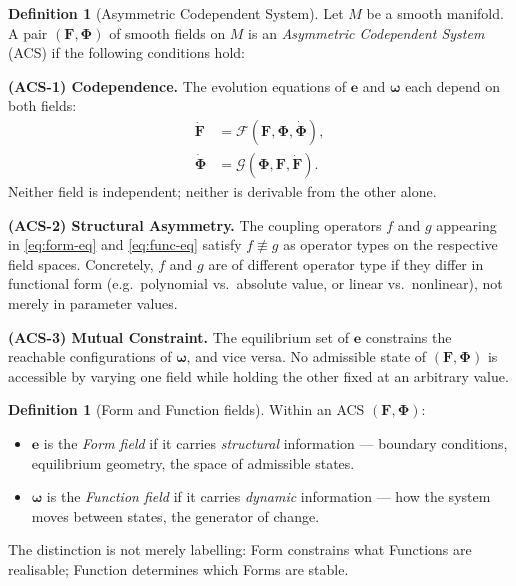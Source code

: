 \documentclass[12pt,a4paper]{article}
\theoremstyle{plain}
\theoremstyle{definition}
\newtheorem{definition}[theorem]{Definition}
\theoremstyle{remark}
\newcommand{\FormF}{\mathbf{F}}
\newcommand{\FuncF}{\boldsymbol{\Phi}}
\providecommand{\Form}{\mathbf{e}}
\providecommand{\Func}{\boldsymbol{\omega}}
\begin{document}
\begin{definition}[Asymmetric Codependent System]\label{def:acs}
Let $M$ be a smooth manifold.  A pair $(\FormF, \FuncF)$ of smooth fields on 
$M$ is an \emph{Asymmetric Codependent System} (ACS) if the following 
conditions hold:

\medskip
\noindent\textbf{(ACS-1) Codependence.}
The evolution equations of $\Form$ and $\Func$ each depend on both fields:
\begin{align}
\dot{\FormF} &= \mathcal{F}(\FormF, \FuncF, \dot{\FuncF}), \label{eq:form-eq}\\
\dot{\FuncF} &= \mathcal{G}(\FuncF, \FormF, \dot{\FormF}). \label{eq:func-eq}
\end{align}
Neither field is independent; neither is derivable from the other alone.

\medskip
\noindent\textbf{(ACS-2) Structural Asymmetry.}
The coupling operators $f$ and $g$ appearing in \eqref{eq:form-eq} and 
\eqref{eq:func-eq} satisfy $f \not\equiv g$ as operator types on the 
respective field spaces.  Concretely, $f$ and $g$ are of different
operator type if they differ in functional form (e.g.\ polynomial vs.\
absolute value, or linear vs.\ nonlinear), not merely in parameter values.

\medskip
\noindent\textbf{(ACS-3) Mutual Constraint.}
The equilibrium set of $\Form$ constrains the reachable configurations of 
$\Func$, and vice versa.  No admissible state of $(\FormF, \FuncF)$ is 
accessible by varying one field while holding the other fixed at an 
arbitrary value.
\end{definition}

\begin{definition}[Form and Function fields]\label{def:FF}
Within an ACS $(\FormF, \FuncF)$:
\begin{itemize}[noitemsep]
  \item $\Form$ is the \emph{Form field} if it carries \emph{structural} 
    information --- boundary conditions, equilibrium geometry, the space of 
    admissible states.
  \item $\Func$ is the \emph{Function field} if it carries \emph{dynamic} 
    information --- how the system moves between states, the generator of 
    change.
\end{itemize}
The distinction is not merely labelling: Form constrains what Functions 
are realisable; Function determines which Forms are stable.
\end{definition}
\end{document}
